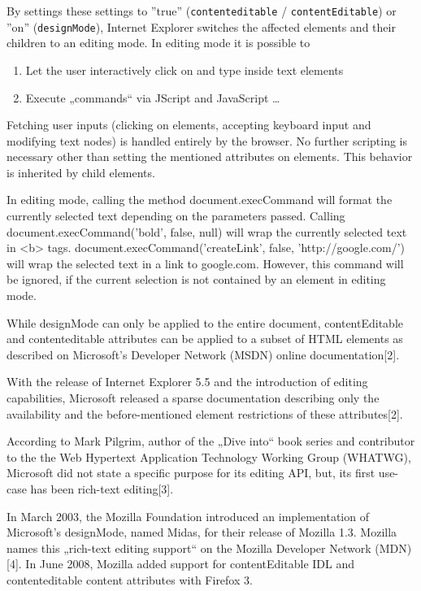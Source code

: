 By settings these settings to ''true'' (\texttt{contenteditable} / \texttt{contentEditable}) or ''on'' (\texttt{designMode}), Internet Explorer switches the affected elements and their children to an editing mode. In editing mode it is possible to

\begin{enumerate} \item Let the user interactively click on and type inside text elements \item Execute „commands“ via JScript and JavaScript \ldots \end{enumerate}

Fetching user inputs (clicking on elements, accepting keyboard input and modifying text nodes) is handled entirely by the browser. No further scripting is necessary other than setting the mentioned attributes on elements. This behavior is inherited by child elements.

In editing mode, calling the method document.execCommand will format the currently selected text depending on the parameters passed. Calling document.execCommand('bold', false, null) will wrap the currently selected text in <b> tags. document.execCommand('createLink', false, 'http://google.com/') will wrap the selected text in a link to google.com. However, this command will be ignored, if the current selection is not contained by an element in editing mode.

While designMode can only be applied to the entire document, contentEditable and contenteditable  attributes can be applied to a subset of HTML elements as described on Microsoft’s Developer Network (MSDN) online documentation[2].

With the release of Internet Explorer 5.5 and the introduction of editing capabilities, Microsoft released a sparse documentation describing only the availability and the before-mentioned element restrictions of these attributes[2]. 

According to Mark Pilgrim, author of the „Dive into“ book series and contributor to the the Web Hypertext Application Technology Working Group (WHATWG), Microsoft did not state a specific purpose for its editing API, but, its first use-case has been rich-text editing[3].

In March 2003, the Mozilla Foundation introduced an implementation of Microsoft's designMode, named Midas, for their release of Mozilla 1.3. Mozilla names this „rich-text editing support“ on the Mozilla Developer Network (MDN)[4]. In June 2008, Mozilla added support for contentEditable IDL and contenteditable content attributes with Firefox 3. 

